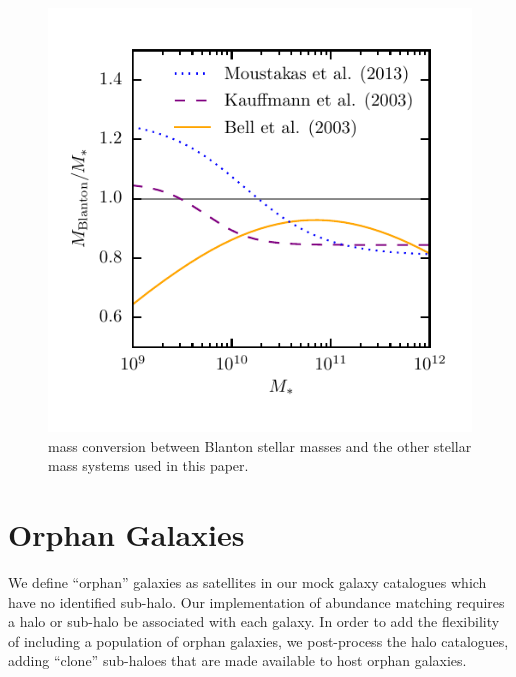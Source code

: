 \documentclass[useAMS,fleqn,usenatbib]{mnras}
\begin{document}
%
\begin{figure}
\includegraphics[width=\columnwidth]{figures/mstar_fconv.pdf}
\caption{mass conversion between Blanton stellar masses and the other stellar mass systems used in this paper.}
\label{fig:mstar_fconv}
\end{figure}
%


\section{Orphan Galaxies}
\label{sec:clones}
 
We define ``orphan'' galaxies as satellites in our mock galaxy catalogues which have no identified sub-halo.  Our implementation of abundance matching requires a halo or sub-halo be associated with each galaxy.  In order to add the flexibility of including a population of orphan galaxies, we post-process the halo catalogues, adding ``clone'' sub-haloes that are made available to host orphan galaxies.
\end{document}
